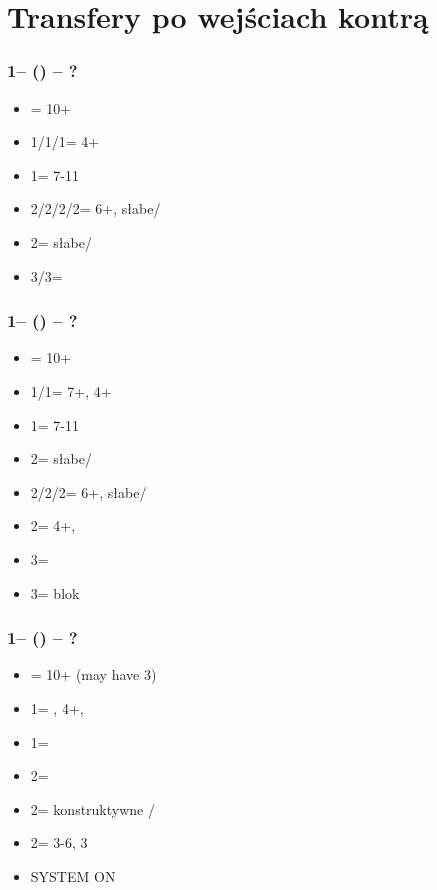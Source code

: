 \documentclass[12pt, a4paper]{report}
\begin{document}
\section*{\colorbox{blue!30}{Transfery po wejściach kontrą}}
 {

    \subsubsection*{1\clubs -- (\dbl) -- ?}
    \begin{itemize}
        \item \rdbl = 10+
        \item 1\diams/1\hearts/1\spades = \trsf{\hearts/\spades/\nt} 4+
        \item 1\nt = 7-11
        \item 2\clubs/2\diams/2\hearts/2\spades = \trsf{\diams/\hearts/\spades/\clubs} 6+, słabe/\gf
        \item 2\nt = \minor słabe/\gf
        \item 3\clubs/3\diams = \inv
    \end{itemize}

    \subsubsection*{1\diams -- (\dbl) -- ?}
    \begin{itemize}
        \item \rdbl = 10+
        \item 1\hearts/1\spades = 7+\hcp, 4+
        \item 1\nt = 7-11
        \item 2\clubs = \diams słabe/\gf
        \item 2\diams/2\hearts/2\spades = \trsf{\hearts/\spades/\clubs} 6+, słabe/\gf
        \item 2\nt = 4+\diams, \invp
        \item 3\clubs = \inv
        \item 3\diams = blok
    \end{itemize}


    \subsubsection*{1\hearts -- (\dbl) -- ?}
    \begin{itemize}
        \item \rdbl = 10+ (may have 3\hearts)
        \item 1\spades = \nat, 4+\spades, \fonce
        \item 1\nt = \trsf{2\clubs}
        \item 2\clubs = \trsf{2\diams}
        \item 2\diams = \trsf{2\hearts} konstruktywne / \gf
        \item 2\hearts = 3-6, 3\hearts
        \item \small{SYSTEM ON}
    \end{itemize}



}
\end{document}
